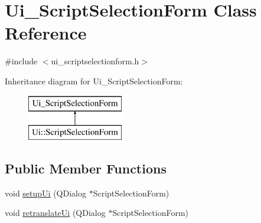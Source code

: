 \hypertarget{class_ui___script_selection_form}{}\section{Ui\+\_\+\+Script\+Selection\+Form Class Reference}
\label{class_ui___script_selection_form}


{\ttfamily \#include $<$ui\+\_\+scriptselectionform.\+h$>$}

Inheritance diagram for Ui\+\_\+\+Script\+Selection\+Form\+:\begin{figure}[H]
\begin{center}
\leavevmode
\includegraphics[height=2.000000cm]{d6/d13/class_ui___script_selection_form}
\end{center}
\end{figure}
\subsection*{Public Member Functions}
\begin{DoxyCompactItemize}
\item 
void \mbox{\hyperlink{class_ui___script_selection_form_aa508f4321cfb7a133d40892d8bdbf9cb}{setup\+Ui}} (Q\+Dialog $\ast$Script\+Selection\+Form)
\item 
void \mbox{\hyperlink{class_ui___script_selection_form_a8d0f33910be1ec066470f5f17b384cc8}{retranslate\+Ui}} (Q\+Dialog $\ast$Script\+Selection\+Form)
\end{DoxyCompactItemize}
